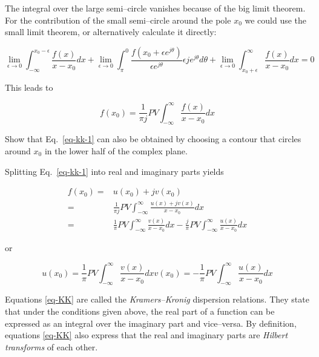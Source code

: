 The integral over the large semi--circle vanishes because of the big limit
theorem. For the contribution of the small semi--circle around the pole $x_0$ we
could use the small limit theorem, or alternatively calculate it directly:

\begin{equation}
\lim_{\epsilon \to 0} \int_{- \infty}^{x_0-\epsilon} \frac{f(x)}{x-x_0}dx +
\lim_{\epsilon \to 0} \int_{\pi}^0 \frac{f(x_0+\epsilon e^{j \theta})}{\epsilon
e^{j\theta}} \epsilon j e^{j \theta} d \theta + \lim_{\epsilon \to 0}
\int_{x_0+\epsilon}^{\infty} \frac{f(x)}{x-x_0}dx = 0
\end{equation} 

This leads to 

\begin{equation}
f(x_0) = \frac{1}{\pi j} PV \int_{- \infty}^{\infty} \frac{f(x)}{x-x_0}dx
\label{eq-kk-1}
\end{equation} 

\begin{sidebar}
\begin{ex}
Show that Eq.~\ref{eq-kk-1} can also be obtained by choosing a contour that circles around $x_0$ in the lower half of the complex plane.
\end{ex}
\end{sidebar}

Splitting Eq.~\ref{eq-kk-1} into real and imaginary parts yields

\begin{align}
f(x_0) =& u(x_0) + jv(x_0) \nonumber \\
       =& \frac{1}{\pi j} PV \int_{- \infty}^{\infty} \frac{u(x)+jv(x)}{x-x_0}dx
 \nonumber \\
       =& \frac{1}{\pi} PV \int_{- \infty}^{\infty} \frac{v(x)}{x-x_0}dx -
\frac{j}{\pi} PV \int_{- \infty}^{\infty} \frac{u(x)}{x-x_0}dx
\end{align}

or

\begin{subequations} 
\begin{equation}
u(x_0) = \frac{1}{\pi} PV \int_{- \infty}^{\infty} \frac{v(x)}{x-x_0}dx
\end{equation} 
\begin{equation}
v(x_0) = -\frac{1}{\pi} PV \int_{- \infty}^{\infty} \frac{u(x)}{x-x_0}dx
\end{equation}
\label{eq-KK}
\end{subequations}

Equations \ref{eq-KK} are called the \emph{Kramers--Kronig} dispersion
relations. They state that under the conditions given above, the real part of a
function can be expressed as an integral over the imaginary part and
vice--versa. By definition, equations \ref{eq-KK} also express that the real and
imaginary parts are \emph{Hilbert transforms} of each other.

